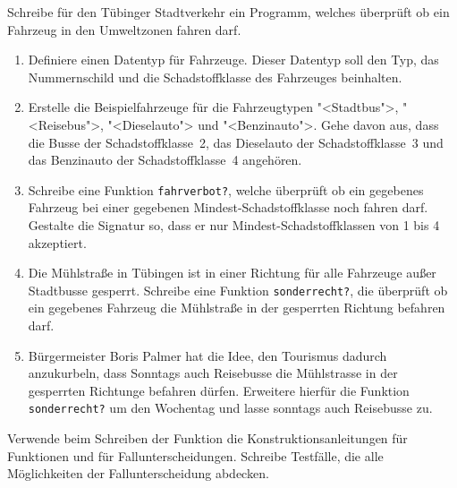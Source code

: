 \begin{aufgabe}

  Schreibe für den Tübinger Stadtverkehr ein
  Programm, welches überprüft ob ein Fahrzeug in den Umweltzonen fahren 
  darf.
  \begin{enumerate}
  \item Definiere einen Datentyp für Fahrzeuge. Dieser
    Datentyp soll den Typ, das Nummernschild und die Schadstoffklasse des
    Fahrzeuges beinhalten.
  \item Erstelle die Beispielfahrzeuge für die
    Fahrzeugtypen "<Stadtbus">, "<Reisebus">, "<Dieselauto">
    und "<Benzinauto">. Gehe davon aus, dass die Busse der
    Schadstoffklasse~2, das Dieselauto der Schadstoffklasse~3 und das
    Benzinauto der Schadstoffklasse~4 angehören.
  \item Schreibe eine Funktion \texttt{fahrverbot?},
    welche überprüft ob ein gegebenes Fahrzeug bei einer gegebenen
    Mindest-Schadstoffklasse noch fahren darf. Gestalte die Signatur
    so, dass er nur Mindest-Schadstoffklassen von 1 bis 4 akzeptiert.
  \item Die Mühlstraße in Tübingen ist in einer Richtung für
    alle Fahrzeuge außer Stadtbusse gesperrt. Schreibe eine Funktion
    \texttt{sonderrecht?}, die überprüft ob ein gegebenes Fahrzeug die
    Mühlstraße in der gesperrten Richtung befahren darf.  
  \item Bürgermeister Boris Palmer hat die Idee, den Tourismus
    dadurch anzukurbeln, dass Sonntags auch Reisebusse die Mühlstrasse in
    der gesperrten Richtunge befahren dürfen. Erweitere hierfür die
    Funktion \texttt{sonderrecht?} um den Wochentag und lasse sonntags
    auch Reisebusse zu.
  \end{enumerate}
  Verwende beim Schreiben der Funktion die
  Konstruktionsanleitungen für Funktionen und für Fallunterscheidungen. 
  Schreibe Testfälle, die alle Möglichkeiten der   
  Fallunterscheidung abdecken.
  
\end{aufgabe}

